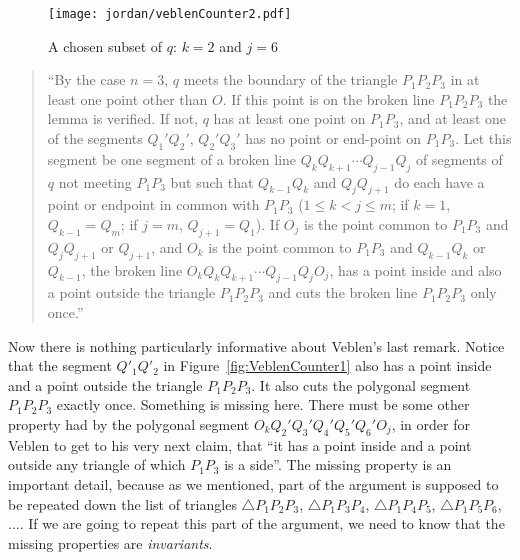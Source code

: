 \begin{figure}
\centering
\texttt{[image: jordan/veblenCounter2.pdf]}
\caption{A chosen subset of $q$: $k=2$ and $j=6$}
\label{fig:VeblenCounter2}
\end{figure}

\begin{quote}
``By the case $n=3$, $q$ meets the boundary of the triangle $P_1P_2P_3$ in at least one point other than $O$. If this point is on the broken line $P_1P_2P_3$ the lemma is verified. If not, $q$ has at least one point on $P_1P_3$, and at least one of the segments $Q_1'Q_2'$, $Q_2'Q_3'$ has no point or end-point on $P_1P_3$. Let this segment be one segment of a broken line $Q_kQ_{k+1}\cdots Q_{j-1}Q_j$ of segments of $q$ not meeting $P_1P_3$ but such that $Q_{k-1}Q_k$ and $Q_jQ_{j+1}$ do each have a point or endpoint in common with $P_1P_3$ ($1 \leq k < j \leq m$; if $k = 1$, $Q_{k-1} = Q_m$; if $j = m$, $Q_{j+1} = Q_1$). If $O_j$ is the point common to $P_1P_3$ and $Q_jQ_{j+1}$ or $Q_{j+1}$, and $O_k$ is the point common to $P_1P_3$ and $Q_{k-1}Q_k$ or $Q_{k-1}$, the broken line $O_kQ_kQ_{k+1}\cdots Q_{j-1}Q_jO_j$, has a point inside and also a point outside the triangle $P_1P_2P_3$ and cuts the broken line $P_1P_2P_3$ only once.''
\end{quote}

Now there is nothing particularly informative about Veblen's last remark. Notice that the segment $Q'_1Q'_2$ in Figure~\ref{fig:VeblenCounter1} also has a point inside and a point outside the triangle $P_1P_2P_3$. It also cuts the polygonal segment $P_1P_2P_3$ exactly once. Something is missing here. There must be some other property had by the polygonal segment $O_kQ_2'Q_3'Q_4'Q_5'Q_6'O_j$, in order for Veblen to get to his very next claim, that ``it has a point inside and a point outside any triangle of which $P_1P_3$ is a side''. The missing property is an important detail, because as we mentioned, part of the argument is supposed to be repeated down the list of triangles $\triangle P_1P_2P_3$, $\triangle P_1P_3P_4$, $\triangle P_1P_4P_5$, $\triangle P_1P_5P_6$, $\ldots$. If we are going to repeat this part of the argument, we need to know that the missing properties are \emph{invariants}.

